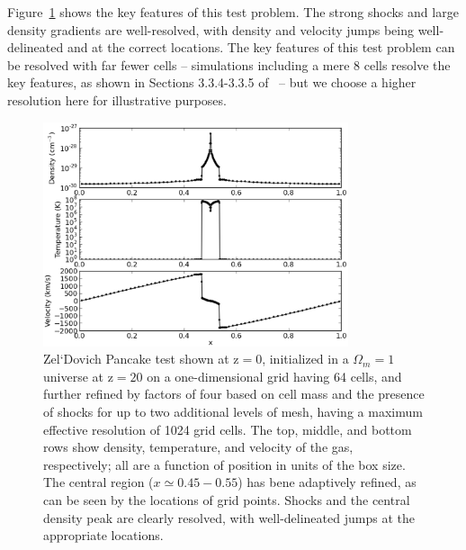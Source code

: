 Figure~\ref{fig.pancake} shows the key features of this test problem.
The strong shocks and large density gradients are well-resolved, with
density and velocity jumps being well-delineated and at the correct locations.  The key features of
this test problem can be resolved with far fewer cells -- simulations
including a mere 8 cells resolve the key features, as shown in
Sections 3.3.4-3.3.5 of~\citet{1996PhDT........80B} -- but we choose a
higher resolution here for illustrative purposes.

\begin{figure}
\begin{center}
\includegraphics[width=0.8\textwidth]{figures/AMRZeldovichPancake.eps}
\caption{Zel`Dovich Pancake test shown at z$ = 0$, initialized in a
$\Omega_m = 1$ universe at z$ = 20$ on a one-dimensional grid having
64 cells, and further refined by factors of four based on cell mass
and the presence of shocks for up to two additional levels of mesh,
having a maximum effective resolution of 1024 grid cells. The top,
middle, and bottom rows show density, temperature, and velocity of the
gas, respectively; all are a function of position in units of the box
size.  The central region ($x \simeq 0.45-0.55$) has bene adaptively
refined, as can be seen by the locations of grid points.  Shocks and
the central density peak are clearly resolved, with well-delineated
jumps at the appropriate locations.}
\label{fig.pancake}
\end{center}
\end{figure}
